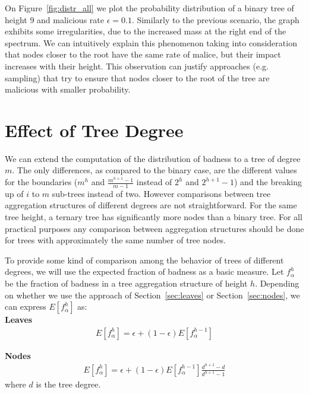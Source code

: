 \documentclass[10pt,twocolumn]{style}
\begin{document}
  On Figure~\ref{fig:distr_all} we plot the probability distribution
  of a binary tree of height $9$ and malicious rate
  $\epsilon=0.1$. Similarly to the previous scenario, the graph
  exhibits some irregularities, due to the increased mass at the right
  end of the spectrum. We can intuitively explain this phenomenon
  taking into consideration that nodes closer to the root have the
  same rate of malice, but their impact increases with their
  height. This observation can justify approaches (e.g. sampling) that try to ensure
  that nodes closer to the root of the tree are malicious with smaller
  probability. 
  
  \section{Effect of Tree Degree}
  \label{sec:degree}
  We can extend the computation of the distribution of badness to a
  tree of degree $m$. The only differences, as compared to the binary
  case, are the different values for the boundaries ($m^h$ and
  $\frac{m^{h+1}-1}{m-1}$ instead of $2^h$ and $2^{h+1}-1$) and the
  breaking up of $i$ to $m$ sub-trees instead of two. However
  comparisons between tree aggregation structures of different degrees
  are not straightforward. For the same tree height, a ternary tree
  has significantly more nodes than a binary tree. For all practical
  purposes any comparison between aggregation structures should be done
  for trees with approximately the same number of tree nodes.

  To provide some kind of comparison among the behavior of trees of
  different degrees, we will use the expected fraction of badness as a
  basic measure.  Let $f^h_\alpha$ be the fraction of badness in a
  tree aggregation structure of height $h$. Depending on whether we
  use the approach of Section~\ref{sec:leaves} or
  Section~\ref{sec:nodes}, we can express $E[f^h_{\alpha}]$ as:\\
  
  {\bf Leaves}\\
  \begin{eqnarray}
    E[f^h_\alpha] = \epsilon + (1-\epsilon)E[f^{h-1}_\alpha]
  \end{eqnarray}

  {\bf Nodes}\\
  \begin{eqnarray}
    E[f^h_\alpha] = \epsilon + (1-\epsilon)E[f^{h-1}_\alpha]\frac{d^{h+1}-d}{d^{h+1}-1}
  \end{eqnarray}
  where $d$ is the tree degree.
\end{document}
